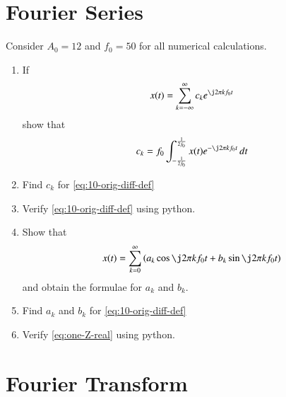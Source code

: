 \documentclass[journal,12pt,twocolumn]{IEEEtran}
\renewcommand\thesection{\arabic{section}}
\begin{document}
\section{Fourier Series}
Consider $A_0 =12$ and $f_0 = 50$ for all numerical calculations.
\begin{enumerate}[label=\thesection.\arabic*,ref=\thesection.\theenumi]
\item If
\begin{align}
	x(t) = \sum_{k = -\infty}^{\infty}c_ke^{\j2\pi kf_0 t}
\label{eq:one-Z-complex}
\end{align}
show that 
\begin{align}
	c_k = f_0\int_{-\frac{1}{2f_0}}^{\frac{1}{2f_0}}x(t)e^{-\j2\pi kf_0 t}\, dt
\label{eq:one-Z}
\end{align}
	\item Find $c_k$ for 
	\eqref{eq:10-orig-diff-def}
\item Verify 
	\eqref{eq:10-orig-diff-def}
	using python.
	\item Show that 
\begin{align}
	x(t) = \sum_{k = 0}^{\infty}\brak{a_k\cos{\j2\pi kf_0 t}+b_k\sin{\j2\pi kf_0 t}}
\label{eq:one-Z-real}
\end{align}
and obtain the formulae for $a_k$ and $b_k$.
\item Find $a_k$ and $b_k$ for 
	\eqref{eq:10-orig-diff-def}
\item Verify 
\eqref{eq:one-Z-real}
using python.

\end{enumerate}
\section{Fourier Transform}

 
\end{document}
